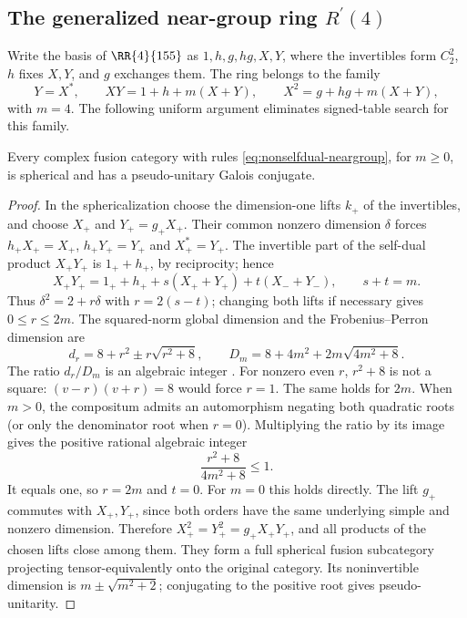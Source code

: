 \subsection{The generalized near-group ring $R^\prime(4)$}
\label{sec:frontier-155}
Write the basis of $\RR{4}{155}$ as $1,h,g,hg,X,Y$, where the
invertibles form $C_2^2$, $h$ fixes $X,Y$, and $g$ exchanges them.
The ring belongs to the family
\begin{equation}\label{eq:nonselfdual-neargroup}
 Y=X^*,\qquad XY=1+h+m(X+Y),\qquad X^2=g+hg+m(X+Y),
\end{equation}
with $m=4$. The following uniform argument eliminates signed-table
search for this family.

\begin{proposition}\label{prop:nonselfdual-neargroup-spherical}
Every complex fusion category with rules
\eqref{eq:nonselfdual-neargroup}, for $m\ge0$, is spherical and has a
pseudo-unitary Galois conjugate.
\end{proposition}
\begin{proof}
In the sphericalization choose the dimension-one lifts $k_+$ of the
invertibles, and choose $X_+$ and $Y_+=g_+X_+$. Their common nonzero
dimension $\delta$ forces
$h_+X_+=X_+$, $h_+Y_+=Y_+$ and $X_+^*=Y_+$.
The invertible part of the self-dual product $X_+Y_+$ is $1_++h_+$,
by reciprocity; hence
\[
 X_+Y_+=1_++h_++s(X_++Y_+)+t(X_-+Y_-),\qquad s+t=m.
\]
Thus $\delta^2=2+r\delta$ with $r=2(s-t)$; changing both lifts if
necessary gives $0\le r\le2m$. The squared-norm global dimension and
the Frobenius--Perron dimension are
\[
 d_r=8+r^2\pm r\sqrt{r^2+8},\qquad
 D_m=8+4m^2+2m\sqrt{4m^2+8}.
\]
The ratio $d_r/D_m$ is an algebraic integer
\cite[Proposition~8.22]{ENO}. For nonzero even $r$, $r^2+8$ is not a
square: $(v-r)(v+r)=8$ would force $r=1$. The same holds for $2m$.
When $m>0$, the compositum admits an automorphism negating both
quadratic roots (or only the denominator root when $r=0$).
Multiplying the ratio by its image gives the positive rational
algebraic integer
\[
 \frac{r^2+8}{4m^2+8}\le1.
\]
It equals one, so $r=2m$ and $t=0$. For $m=0$ this holds directly.
The lift $g_+$ commutes with $X_+,Y_+$, since both orders have the same
underlying simple and nonzero dimension. Therefore
$X_+^2=Y_+^2=g_+X_+Y_+$, and all products of the chosen lifts close
among them. They form a full spherical fusion subcategory projecting
tensor-equivalently onto the original category. Its noninvertible
dimension is $m\pm\sqrt{m^2+2}$; conjugating to the positive root
gives pseudo-unitarity.
\end{proof}

